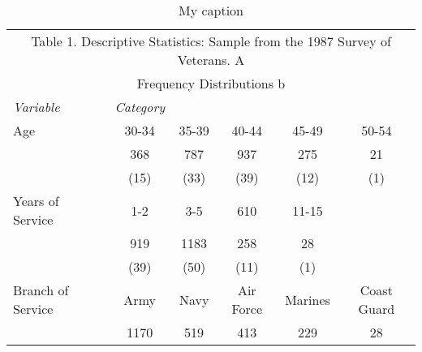 \documentclass{article}
\begin{document}
\begin{table}[]
\centering
\caption{My caption}
\label{my-label}
\begin{tabular}{lcclcc}
\multicolumn{6}{c}{Table 1. Descriptive Statistics: Sample from the 1987 Survey of Veterans. A}                                                                                                                                                                                                                                                                                                                                                                                                  \\
\multicolumn{6}{c}{Frequency Distributions b}                                                                                                                                                                                                                                                                                                                                                                                                                                                    \\
\textit{Variable}   & \textit{Category}    &            & \multicolumn{1}{c}{}              &            &                  \\
Age                 & 30-34                & 35-39      & \multicolumn{1}{c}{40-44}         & 45-49      & 50-54            \\
                    & 368                  & 787        & \multicolumn{1}{c}{937}           & 275        & 21               \\
                    & (15)                 & (33)       & \multicolumn{1}{c}{(39)}          & (12)       & (1)              \\
Years of Service    & 1-2                  & 3-5        & \multicolumn{1}{c}{610}           & 11-15      &                  \\
                    & 919                  & 1183       & \multicolumn{1}{c}{258}           & 28         &                  \\
                    & (39)                 & (50)       & \multicolumn{1}{c}{(11)}          & (1)        &                  \\
Branch of Service   & Army                 & Navy       & \multicolumn{1}{c}{Air Force}     & Marines    & Coast Guard      \\
                    & 1170                 & 519        & \multicolumn{1}{c}{413}           & 229        & 28               \\

\end{tabular}
\end{table}
\end{document}

